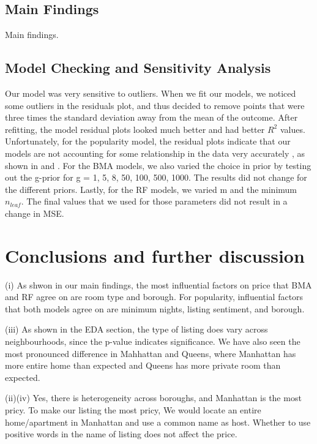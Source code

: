 \documentclass[10pt]{jmlr}%
\begin{document}
\subsection{Main Findings}
Main findings.

\subsection{Model Checking and Sensitivity Analysis}
Our model was very sensitive to outliers. When we fit our models, we noticed some outliers in the residuals plot, and thus decided to remove points that were three times the standard deviation away from the mean of the outcome. After refitting, the model residual plots looked much better and had better $R^2$ values. Unfortunately, for the popularity model, the residual plots indicate that our models are not accounting for some relationship in the data very accurately , as shown in  and . For the BMA models, we also varied the choice in prior by testing out the g-prior for g = 1, 5, 8, 50, 100, 500, 1000. The results did not change for the different priors. Lastly, for the RF models, we varied m and the minimum $n_{leaf}$. The final values that we used for those parameters did not result in a change in MSE. 

\section{Conclusions and further discussion}
\label{sec:conclusion}

(i) As shwon in our main findings, the most influential factors on price that BMA and RF agree on are room type and borough. For popularity, influential factors that both models agree on are minimum nights, listing sentiment, and borough.

(iii) As shown in the EDA section, the type of listing does vary across neighbourhoods, since the p-value indicates significance. We have also seen the most pronounced difference in Mahhattan and Queens, where Manhattan has more entire home than expected and Queens has more private room than expected.

(ii)(iv) Yes, there is heterogeneity across boroughs, and Manhattan is the most pricy. To make our listing the most pricy, We would locate an entire home/apartment in Manhattan and use a common name as host. Whether to use positive words in the name of listing does not affect the price.
\end{document}
